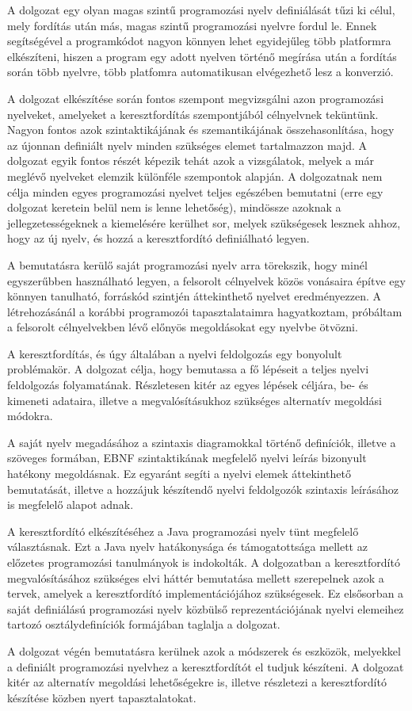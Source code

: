 
A dolgozat egy olyan magas szintű programozási nyelv definiálását tűzi ki célul, mely fordítás után más, magas szintű programozási nyelvre fordul le. Ennek segítségével a programkódot nagyon könnyen lehet egyidejűleg több platformra elkészíteni, hiszen a program egy adott nyelven történő megírása után a fordítás során több nyelvre, több platfomra automatikusan elvégezhető lesz a konverzió.

A dolgozat elkészítése során fontos szempont megvizsgálni azon programozási nyelveket, amelyeket a keresztfordítás szempontjából célnyelvnek teküntünk. Nagyon fontos azok szintaktikájának és szemantikájának összehasonlítása, hogy az újonnan definiált nyelv minden szükséges elemet tartalmazzon majd. A dolgozat egyik fontos részét képezik tehát azok a vizsgálatok, melyek a már meglévő nyelveket elemzik különféle szempontok alapján. A dolgozatnak nem célja minden egyes programozási nyelvet teljes egészében bemutatni (erre egy dolgozat keretein belül nem is lenne lehetőség), mindössze azoknak a jellegzetességeknek a kiemelésére kerülhet sor, melyek szükségesek lesznek ahhoz, hogy az új nyelv, és hozzá a keresztfordító definiálható legyen.

A bemutatásra kerülő saját programozási nyelv arra törekszik, hogy minél egyszerűbben használható legyen, a felsorolt célnyelvek közös vonásaira építve egy könnyen tanulható, forráskód szintjén áttekinthető nyelvet eredményezzen. A létrehozásánál a korábbi programozói tapasztalataimra hagyatkoztam, próbáltam a felsorolt célnyelvekben lévő előnyös megoldásokat egy nyelvbe ötvözni.

A keresztfordítás, és úgy általában a nyelvi feldolgozás egy bonyolult problémakör. A dolgozat célja, hogy bemutassa a fő lépéseit a teljes nyelvi feldolgozás folyamatának. Részletesen kitér az egyes lépések céljára, be- és kimeneti adataira, illetve a megvalósításukhoz szükséges alternatív megoldási módokra.

A saját nyelv megadásához a szintaxis diagramokkal történő definíciók, illetve a szöveges formában, EBNF szintaktikának megfelelő nyelvi leírás bizonyult hatékony megoldásnak. Ez egyaránt segíti a nyelvi elemek áttekinthető bemutatását, illetve a hozzájuk készítendő nyelvi feldolgozók szintaxis leírásához is megfelelő alapot adnak.

A keresztfordító elkészítéséhez a Java programozási nyelv tünt megfelelő választásnak. Ezt a Java nyelv hatákonysága és támogatottsága mellett az előzetes programozási tanulmányok is indokolták. A dolgozatban a keresztfordító megvalósításához szükséges elvi háttér bemutatása mellett szerepelnek azok a tervek, amelyek a keresztfordító implementációjához szükségesek. Ez elsősorban a saját definiálású programozási nyelv közbülső reprezentációjának nyelvi elemeihez tartozó osztálydefiníciók formájában taglalja a dolgozat.

A dolgozat végén bemutatásra kerülnek azok a módszerek és eszközök, melyekkel a definiált programozási nyelvhez a keresztfordítót el tudjuk készíteni. A dolgozat kitér az alternatív megoldási lehetőségekre is, illetve részletezi a keresztfordító készítése közben nyert tapasztalatokat.
